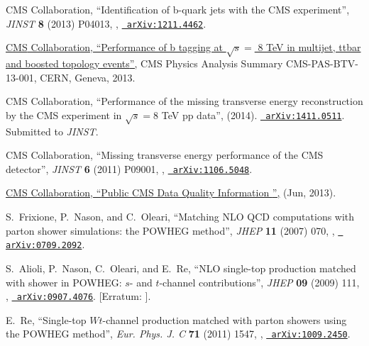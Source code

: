 \documentclass[12pt]{thesis}  %
\begin{document}
\begin{thebibliography}{100}
\hrefCMSnoop {} {{ CMS} Collaboration, ``{Identification of b-quark jets with
  the CMS experiment}'',} \textit{ JINST} \textbf{ 8} (2013) P04013,
  \href{http://dx.doi.org/10.1088/1748-0221/8/04/P04013}{},
\href{http://www.arXiv.org/abs/1211.4462}{\texttt{ arXiv:1211.4462}}.

\href {http://cds.cern.ch/record/1581306/} {{ CMS} Collaboration,
  ``{Performance of b tagging at $\sqrt{s} =$ 8 TeV in multijet, ttbar and
  boosted topology events}'',} CMS Physics Analysis Summary CMS-PAS-BTV-13-001,
  CERN, Geneva, 2013.

\hrefCMSnoop {} {{ CMS} Collaboration, ``Performance of the missing transverse
  energy reconstruction by the CMS experiment in $\sqrt{s} = 8$ TeV pp data'',}
  (2014). \href{http://www.arXiv.org/abs/1411.0511}{\texttt{ arXiv:1411.0511}}.
  Submitted to \emph{JINST}.

\hrefCMSnoop {} {{ CMS} Collaboration, ``Missing transverse energy performance
  of the CMS detector'',} \textit{ JINST} \textbf{ 6} (2011) P09001,
  \href{http://dx.doi.org/doi:10.1088/1748-0221/6/09/P09001}{},
  \href{http://www.arXiv.org/abs/1106.5048}{\texttt{ arXiv:1106.5048}}.

\href {https://twiki.cern.ch/twiki/bin/view/CMSPublic/DataQuality} {{ CMS}
  Collaboration, ``{Public CMS Data Quality Information }'',} (Jun, 2013).

\hrefCMSnoop {} {S.~Frixione, P.~Nason, and C.~Oleari, ``Matching {NLO QCD}
  computations with parton shower simulations: the {POWHEG} method'',} \textit{
  JHEP} \textbf{ 11} (2007) 070,
  \href{http://dx.doi.org/10.1088/1126-6708/2007/11/070}{},
  \href{http://www.arXiv.org/abs/0709.2092}{\texttt{ arXiv:0709.2092}}.

\hrefCMSnoop {} {S.~Alioli, P.~Nason, C.~Oleari, and E.~Re, ``{NLO single-top
  production matched with shower in POWHEG: $s$- and $t$-channel
  contributions}'',} \textit{ JHEP} \textbf{ 09} (2009) 111,
  \href{http://dx.doi.org/10.1088/1126-6708/2009/09/111}{},
  \href{http://www.arXiv.org/abs/0907.4076}{\texttt{ arXiv:0907.4076}}.
[Erratum: ].

\hrefCMSnoop {} {E.~Re, ``{Single-top $Wt$-channel production matched with
  parton showers using the POWHEG method}'',} \textit{ Eur. Phys. J. C}
  \textbf{ 71} (2011) 1547,
  \href{http://dx.doi.org/10.1140/epjc/s10052-011-1547-z}{},
\href{http://www.arXiv.org/abs/1009.2450}{\texttt{ arXiv:1009.2450}}.


\end{thebibliography}
\end{document}

